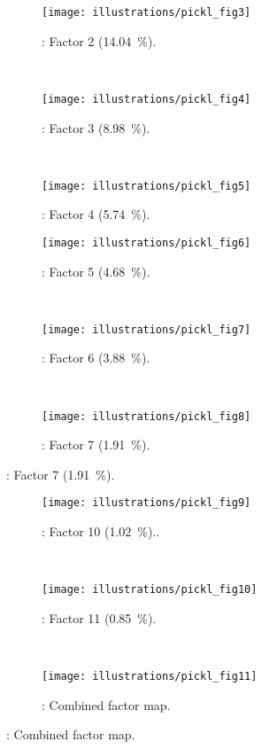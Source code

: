 \documentclass[output=paper]{LSP/langsci}
\begin{document}
\begin{figure}
\centering
\begin{subfigure}[t]{0.3\textwidth}
\texttt{[image: illustrations/pickl\_fig3]}
\caption{: Factor 2 (14.04~\%).}
\label{fig:3}
\end{subfigure}   
~
\begin{subfigure}[t]{0.3\textwidth}
\texttt{[image: illustrations/pickl\_fig4]}
\caption{: Factor 3 (8.98~\%).}
\label{fig:4}
\end{subfigure}  
~
\begin{subfigure}[t]{0.3\textwidth}
\texttt{[image: illustrations/pickl\_fig5]}
\caption{: Factor 4 (5.74~\%).}
\label{fig:5}
\end{subfigure}

\vskip11pt

\begin{subfigure}[t]{0.3\textwidth}
\texttt{[image: illustrations/pickl\_fig6]}
\caption{: Factor 5 (4.68~\%).}
\label{fig:6}
\end{subfigure}   
~
\begin{subfigure}[t]{0.3\textwidth}
\texttt{[image: illustrations/pickl\_fig7]}
\caption{: Factor 6 (3.88~\%).}
\label{fig:7}
\end{subfigure}  
~
\begin{subfigure}[t]{0.3\textwidth}
\texttt{[image: illustrations/pickl\_fig8]}
\caption{: Factor 7 (1.91~\%).}
\label{fig:8}
\end{subfigure}
\end{figure}

\begin{figure}
\begin{subfigure}[t]{0.3\textwidth}
\texttt{[image: illustrations/pickl\_fig9]}
\caption{: Factor 10 (1.02~\%)..}
\label{fig:9}
\end{subfigure}   
~
\begin{subfigure}[t]{0.3\textwidth}
\texttt{[image: illustrations/pickl\_fig10]}
\caption{: Factor 11 (0.85~\%).}
\label{fig:10}
\end{subfigure}  
~
\begin{subfigure}[t]{0.3\textwidth}
\texttt{[image: illustrations/pickl\_fig11]}
\caption{: Combined factor map.}
\label{fig:11}
\end{subfigure}
\end{figure}
\end{document}
